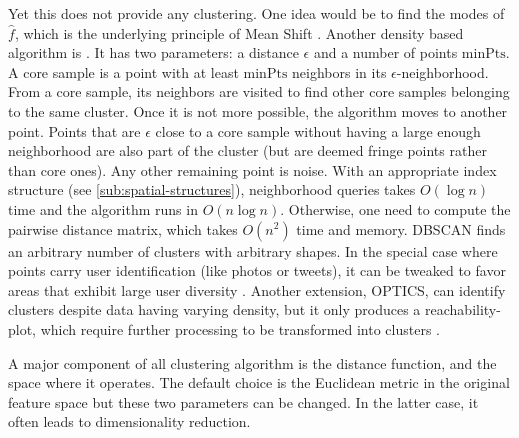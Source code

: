Yet this does not provide any clustering. One idea would be to find the modes of
$\hat{f}$, which is the underlying principle of Mean Shift
\autocite{MeanShift95}. Another density based algorithm is
 \autocite{DBSCAN96}. It has two parameters: a
distance $\epsilon$ and a number of points $\mathrm{minPts}$. A core sample is
a point with at least $\mathrm{minPts}$ neighbors in its
$\epsilon$-neighborhood. From a core sample, its neighbors are visited to find
other core samples belonging to the same cluster. Once it is not more possible,
the algorithm moves to another point. Points that are $\epsilon$ close to a
core sample without having a large enough neighborhood are also part of the
cluster (but are deemed fringe points rather than core ones). Any other
remaining point is noise. With an appropriate index structure (see
\autoref{sub:spatial-structures}), neighborhood queries takes $O(\log n)$ time
and the algorithm runs in $O(n\log n)$. Otherwise, one need to compute the
pairwise distance matrix, which takes $O(n^2)$ time and memory. DBSCAN finds
an arbitrary number of clusters with arbitrary shapes. In the special case where
points carry user identification (like photos or tweets), it can be tweaked to
favor areas that exhibit large user diversity \autocite{PDBSCANKisilevich2010}.
Another extension, OPTICS, can identify clusters despite data having varying
density, but it only produces a reachability-plot, which require further
processing to be transformed into clusters \autocite{OPTICS99}.

\iffalse
\begin{comments}
	I didn't use these methods so I probably don't need to talk about it\\
	Some are based on graphs. For instance \methodname{Spectral
	Clustering} \autocite{SpectralClustering01} (which is related to
	Kernel $k$-means, as shown by \textcite{KernelKmeans04}).
	\methodname{Affinity Propagation} \autocite{AffinityPropagation07}

	Others are hierarchical
\url{https://en.wikipedia.org/wiki/Hierarchical_clustering}
\end{comments}
\fi

A major component of all clustering algorithm is the distance function, and
the space where it operates. The default choice is the Euclidean metric in the
original feature space but these two parameters can be changed. In the latter
case, it often leads to dimensionality reduction.

